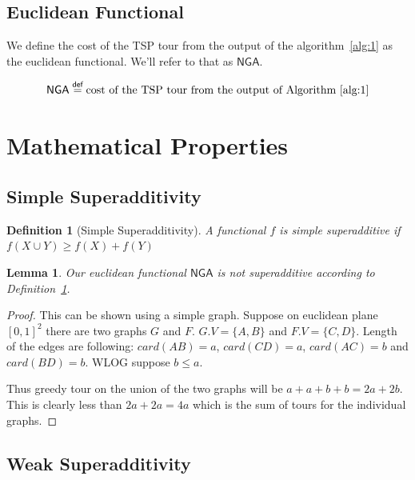 \documentclass{article}
\theoremstyle{define}
\newtheorem{define}{Definition}[section]
\newtheorem{lemma}[theorem]{Lemma}
\theoremstyle{remark}
\begin{document}
\subsection{Euclidean Functional}
We define the cost of the TSP tour from the output of the algorithm~\ref{alg:1} as the euclidean functional.
We'll refer to that as $\textsf{NGA}$.

\begin{align*}
    \textsf{NGA} \stackrel{\textsf{def}}{=} \text{cost of the TSP tour from the output of Algorithm~\ref{alg:1}}
\end{align*}

\section{Mathematical Properties}


\subsection{Simple Superadditivity}

\begin{define}[Simple Superadditivity]\label{def:simplesuperadditive}
    \textit{A functional $f$ is simple superadditive if $f(X \cup Y) \geq f(X) + f(Y)$}
\end{define}

\vspace{0.5em}

\begin{lemma}
    Our euclidean functional $\textsf{NGA}$ is not superadditive according to
    Definition~\ref{def:simplesuperadditive}. 
\end{lemma}

\begin{proof}
    This can be shown using a simple graph. Suppose on
    euclidean plane $[0, 1]^2$ there are two graphs $G$ and $F$. $G.V = \{A, B\}$
    and $F.V = \{C, D\}$. Length of the edges are following: $card(AB) = a$,
    $card(CD) = a$, $card(AC) = b$ and $card(BD) = b$. WLOG suppose $b \leq a$.
    
    Thus greedy tour on the union of the two graphs will be $a + a + b + b = 2a +
        2b$. This is clearly less than $2a + 2a = 4a$ which is the sum of tours for the
    individual graphs.
\end{proof}


\subsection{Weak Superadditivity}
\end{document}
